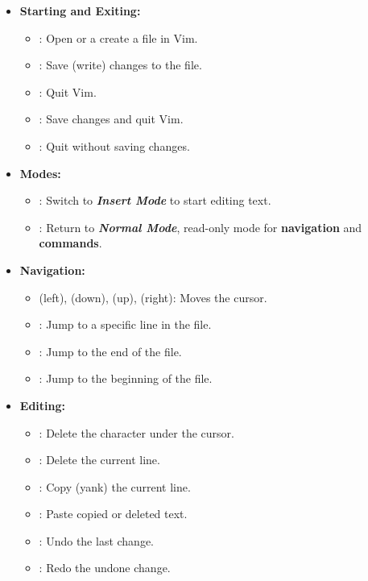 \begin{Def}

\begin{itemize}
    \item \textbf{Starting and Exiting:}
        \begin{itemize}
            \item {}: Open or a create a file in Vim.
            \item {}: Save (write) changes to the file.
            \item {}: Quit Vim.
            \item {}: Save changes and quit Vim.
            \item {}: Quit without saving changes.
        \end{itemize}
    
    \item \textbf{Modes:}
        \begin{itemize}
            \item {}: Switch to \textbf{\textit{Insert Mode}} to start editing text.
            \item {}: Return to \textbf{\textit{Normal Mode}}, read-only mode for \textbf{navigation} and \textbf{commands}.
        \end{itemize}
    
    \item \textbf{Navigation:}
        \begin{itemize}
            \item {} (left),  (down),  (up),  (right): Moves the cursor.
            \item {}: Jump to a specific line in the file.
            \item {}: Jump to the end of the file.
            \item {}: Jump to the beginning of the file.
        \end{itemize}
    
    \item \textbf{Editing:}
        \begin{itemize}
            \item {}: Delete the character under the cursor.
            \item {}: Delete the current line.
            \item {}: Copy (yank) the current line.
            \item {}: Paste copied or deleted text.
            \item {}: Undo the last change.
            \item {}: Redo the undone change.
        \end{itemize}
    

\end{itemize}
\end{Def}
